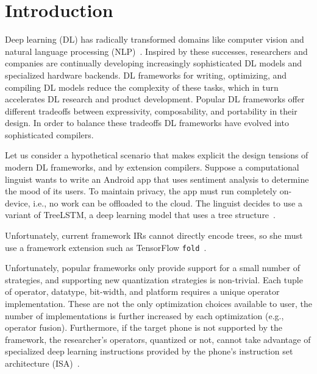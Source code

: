 \section{Introduction}
\label{sec:intro}

Deep learning (DL) has radically transformed domains like
  computer vision and
  natural language processing (NLP)~\cite{yolo, recent_trends_in_nlp}.
Inspired by these successes,
  researchers and companies are continually
  developing increasingly sophisticated DL models and
  specialized hardware backends.
DL frameworks for writing, optimizing, and compiling DL models
  reduce the complexity of these tasks,
  which in turn accelerates DL research and product development.
Popular DL frameworks offer different tradeoffs between
  expressivity, composability, and portability in their design.
In order to balance these tradeoffs DL frameworks have
  evolved into sophisticated compilers.

Let us consider a hypothetical scenario that makes explicit
  the design tensions of modern DL frameworks, and by
  extension compilers.
Suppose a computational linguist wants to write
  an Android app that uses sentiment analysis to
  determine the mood of its users.
To maintain privacy, the app must run completely on-device,
  i.e., no work can be offloaded to the cloud.
The linguist decides to use a variant of TreeLSTM,
  a deep learning model that uses a tree structure~\cite{tree_lstm}.

Unfortunately, current framework IRs cannot directly encode trees,
  so she must use a framework extension
  such as TensorFlow \verb|fold|~\cite{tensorflowfold}.

Unfortunately, popular frameworks only provide support for a small number
  of strategies, and supporting new quantization strategies is non-trivial.
Each tuple of operator, datatype, bit-width, and
  platform requires a unique operator implementation.
These are not the only optimization choices available
  to user, the number of implementations is further
  increased by each optimization (e.g., operator fusion).
Furthermore, if the target phone
  is not supported by the framework,
  the researcher's operators,
  quantized or not,
  cannot take advantage of specialized deep learning instructions
  provided by the phone's instruction set architecture (ISA)~\cite{apple_neural_engine}.


